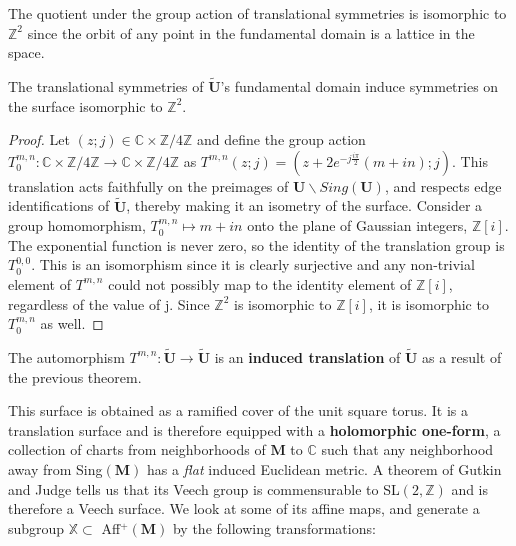 \documentclass[]{article}
\begin{document}
The quotient under the group action of translational symmetries is isomorphic to $\mathbb{Z}^2$ since the orbit of any point in the fundamental domain is a lattice in the space. 

\begin{thm}
The translational symmetries of $\tilde{\mathbf{U}}$'s fundamental domain induce symmetries on the surface isomorphic to $\mathbb{Z}^2$.
\begin{proof}
Let $(z;j)\in\mathbb{C}\times\mathbb{Z}/4\mathbb{Z}$ and define the group action $T_0^{m,n}:\mathbb{C}\times\mathbb{Z}/4\mathbb{Z}\rightarrow\mathbb{C}\times\mathbb{Z}/4\mathbb{Z}$ as $T^{m,n}(z;j)=(z+2e^{-j\frac{i\pi}{2}}(m+in);j)$. This translation acts faithfully on the preimages of $\mathbf{U}\backslash Sing(\mathbf{U})$, and respects edge identifications of $\mathbf{\tilde{\mathbf{U}}}$, thereby making it an isometry of the surface. Consider a group homomorphism, $T_0^{m,n}\mapsto m+in$ onto the plane of Gaussian integers, $\mathbb{Z}[i]$. The exponential function is never zero, so the identity of the translation group is $T_0^{0,0}$. This is an isomorphism since it is clearly surjective and any non-trivial element of $T^{m,n}$ could not possibly map to the identity element of $\mathbb{Z}[i]$, regardless of the value of j. Since $\mathbb{Z}^2$ is isomorphic to $\mathbb{Z}[i]$, it is isomorphic to  $T_0^{m,n}$ as well.
\end{proof}
\label{thm:z2}
\end{thm}


\begin{Def}
The automorphism $T^{m,n}:\tilde{\mathbf{U}}\rightarrow\tilde{\mathbf{U}}$ is an  \textbf{induced translation} of $\tilde{\mathbf{U}}$ as a result of the previous theorem.
\end{Def}




This surface is obtained as a ramified cover of the unit square torus. It is a translation surface and is therefore equipped with a \textbf{holomorphic one-form}, a collection of charts from neighborhoods of $\mathbf{M}$ to $\mathbb{C}$ such that any neighborhood away from Sing$(\mathbf{M})$ has a \emph{flat} induced Euclidean metric. A theorem of Gutkin and Judge tells us that its Veech group is commensurable to SL$(2,\mathbb{Z})$ and is therefore a Veech surface. We look at some of its affine maps, and generate a subgroup $\mathbb{X}\subset$ Aff$^+(\mathbf{M})$  by the following transformations:
\end{document}
